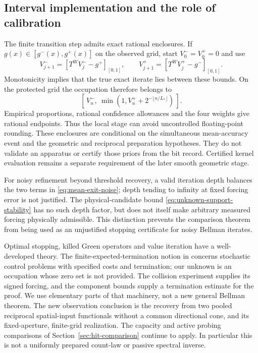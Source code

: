 \subsection{Interval implementation and the role of calibration}
The finite transition step admits exact rational enclosures. If
$g(x)\in[g^-(x),g^+(x)]$ on the observed grid, start $V_0^-=V_0^+=0$
and use
\begin{equation}\label{eq:interval-bellman}
 V_{j+1}^-=[T^W V_j^- -g^+]_{[0,1]},\qquad
 V_{j+1}^+=[T^W V_j^+ -g^-]_{[0,1]}.
\end{equation}
Monotonicity implies that the true exact iterate lies between these
bounds. On the protected grid the occupation therefore belongs to
\begin{equation}\label{eq:occupation-enclosure}
 [\,V_n^-,\ \min(1,V_n^++2^{-\lfloor n/L_*\rfloor})\,].
\end{equation}
Empirical proportions, rational confidence allowances and the four
weights give rational endpoints. Thus the local stage can avoid
uncontrolled floating-point rounding. These enclosures are conditional
on the simultaneous mean-accuracy event and the geometric and reciprocal
preparation hypotheses. They do not validate an apparatus or certify
those priors from the bit record. Certified kernel evaluation remains
a separate requirement of the later smooth geometric stage.

For noisy refinement beyond threshold recovery, a valid iteration depth
balances the two terms in \eqref{eq:mean-exit-noise}; depth tending to
infinity at fixed forcing error is not justified. The physical-candidate
bound \eqref{eq:unknown-support-stability} has no such depth factor,
but does not itself make arbitrary measured forcing physically
admissible. This distinction prevents the comparison theorem from being
used as an unjustified stopping certificate for noisy Bellman iterates.

Optimal stopping, killed Green operators and value iteration have a
well-developed theory. The finite-expected-termination notion in
\cite{Bertsekas} concerns stochastic control problems with specified
costs and termination; our unknown is an occupation whose zero set is
not provided. The collision experiment supplies its signed forcing,
and the component bounds supply a termination estimate for the proof.
We use elementary parts of that machinery, not a new general Bellman
theorem. The new observation conclusion is the recovery from two pooled
reciprocal spatial-input functionals without a common directional cone,
and its fixed-aperture, finite-grid realization. The capacity and active
probing comparisons of Section~\ref{sec:hit-comparison} continue to
apply. In particular this is not a uniformly prepared count-law or
passive spectral inverse.
